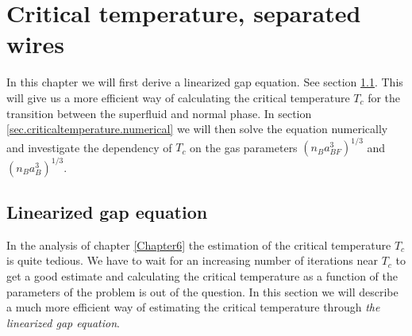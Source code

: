 \chapter{Critical temperature, separated wires} %

\label{Appendix.criticaltemperature} %
\chead{}

In this chapter we will first derive a linearized gap equation. See section \ref{sec.linearizedgapequation}. This will give us a more efficient way of calculating the critical temperature $T_c$ for the transition between the superfluid and normal phase. In section \ref{sec.criticaltemperature.numerical} we will then solve the equation numerically and investigate the dependency of $T_c$ on the gas parameters $(n_Ba_{BF}^3)^{1/3}$ and $(n_Ba_B^3)^{1/3}$. 

\section{Linearized gap equation} \label{sec.linearizedgapequation}
In the analysis of chapter \ref{Chapter6} the estimation of the critical temperature $T_c$ is quite tedious. We have to wait for an increasing number of iterations near $T_c$ to get a good estimate and calculating the critical temperature as a function of the parameters of the problem is out of the question. In this section we will describe a much more efficient way of estimating the critical temperature through \textit{the linearized gap equation}. 


